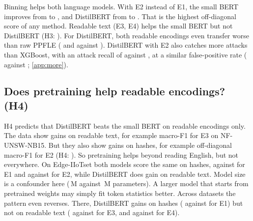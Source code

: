 Binning helps both language models. With E2 instead of E1, the small BERT improves from
 to , and DistilBERT from
 to . That is the highest
off-diagonal score of any method. Readable text (E3, E4) helps the small BERT but not DistilBERT (H3:
). For DistilBERT, both readable encodings even
transfer worse than raw PPFLE ( and
 against ). DistilBERT with E2 also catches more attacks
than XGBoost, with an attack recall of  against
, at a similar false-positive rate
( against ; \cref{app:more}).

\subsection{Does pretraining help readable encodings? (H4)}
H4 predicts that DistilBERT beats the small BERT on readable encodings only. The data show gains on readable text,
for example 
macro-F1 for E3 on NF-UNSW-NB15. But they also show gains on hashes, for example
 off-diagonal
macro-F1 for E2 (H4: ). So pretraining helps beyond reading English, but not everywhere. On
Edge-IIoTset both models score the same on hashes,  against
 for E1 and
 against
 for E2, while DistilBERT does gain on readable text. Model
size is a confounder here (\,M against \,M
parameters). A larger model that starts from pretrained weights may simply fit token statistics better.
Across datasets the pattern even reverses. There, DistilBERT gains on hashes
( against  for E1) but not on
readable text ( against  for E3, and
 against  for E4).

